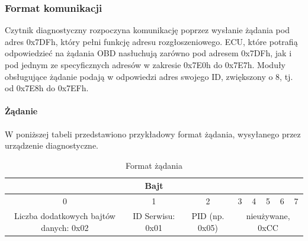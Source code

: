\documentclass[10pt,a4paper]{scrartcl}
\begin{document}
		\subsubsection{Format komunikacji}
		Czytnik diagnostyczny rozpoczyna komunikację poprzez wysłanie żądania pod adres 0x7DFh, który pełni funkcję adresu rozgłoszeniowego. ECU, które potrafią odpowiedzieć na żądania OBD nasłuchują zarówno pod adresem 0x7DFh, jak i pod jednym ze specyficznych adresów w zakresie 0x7E0h do 0x7E7h. Moduły obsługujące żądanie podają w odpowiedzi adres swojego ID, zwiększony o 8, tj. od 0x7E8h do 0x7EFh.
		\paragraph{Żądanie}
		W poniższej tabeli przedstawiono przykładowy format żądania, wysyłanego przez urządzenie diagnostyczne.
		\begin{table}[H]
			\caption{Format żądania}
			\begin{center}
				\begin{tabular}{|c|c|c|c|c|c|c|c|}
					\hline
					\multicolumn{8}{|c|}{Bajt}\\
					\hline
					0&1&2&3&4&5&6&7\\
					\hline
					Liczba dodatkowych bajtów danych: 0x02& ID Serwisu: 0x01&PID (np. 0x05)&\multicolumn{5}{|c|}{nieużywane, 0xCC}\\
					\hline
				\end{tabular}
			\end{center}
			\label{tab:żądanie}
		\end{table}
\end{document}
